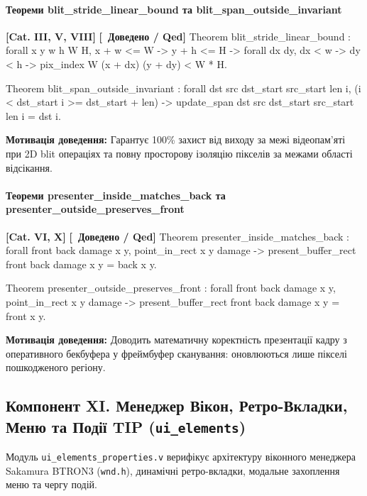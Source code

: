 \documentclass{article}
\let\originalfootnotesize\footnotesize
\let\oldverbatim\verbatim
\let\oldendverbatim\endverbatim
\renewenvironment{verbatim}{\originalfootnotesize\oldverbatim}{\oldendverbatim}
\newcommand{\thmcategory}[1]{{\small\textbf{\color{coreblue}[#1]}}}
\newcommand{\thmproven}{{\small\textbf{\color{productgreen}[\checkmark\ Доведено / Qed]}}}
\newcommand{\thmmotivation}[1]{%
  \par\smallskip\noindent\colorbox{boxbg}{\parbox{\dimexpr\linewidth-2\fboxsep\relax}{%
    \small\textbf{Мотивація доведення:} #1%
  }}\par\medskip
}
\begin{document}
\paragraph{Теореми blit\_stride\_linear\_bound та blit\_span\_outside\_invariant} \thmcategory{Cat. III, V, VIII} \thmproven
\begin{verbatim}
Theorem blit_stride_linear_bound : forall x y w h W H,
  x + w <= W -> y + h <= H ->
  forall dx dy, dx < w -> dy < h ->
  pix_index W (x + dx) (y + dy) < W * H.

Theorem blit_span_outside_invariant : forall dst src dst_start src_start len i,
  (i < dst_start \/ i >= dst_start + len) ->
  update_span dst src dst_start src_start len i = dst i.
\end{verbatim}
\thmmotivation{Гарантує 100\% захист від виходу за межі відеопам'яті при 2D blit операціях та повну просторову ізоляцію пікселів за межами області відсікання.}

\paragraph{Теореми presenter\_inside\_matches\_back та presenter\_outside\_preserves\_front} \thmcategory{Cat. VI, X} \thmproven
\begin{verbatim}
Theorem presenter_inside_matches_back : forall front back damage x y,
  point_in_rect x y damage ->
  present_buffer_rect front back damage x y = back x y.

Theorem presenter_outside_preserves_front : forall front back damage x y,
  ~ point_in_rect x y damage ->
  present_buffer_rect front back damage x y = front x y.
\end{verbatim}
\thmmotivation{Доводить математичну коректність презентації кадру з оперативного бекбуфера у фреймбуфер сканування: оновлюються лише пікселі пошкодженого регіону.}

\subsection[Компонент XI. Менеджер Вікон та HMI]{Компонент XI. Менеджер Вікон, Ретро-Вкладки, Меню та Події TIP (\texttt{ui\_elements})}

Модуль \texttt{ui\_elements\_properties.v} верифікує архітектуру віконного менеджера Sakamura BTRON3 (\texttt{wnd.h}), динамічні ретро-вкладки, модальне захоплення меню та чергу подій.
\end{document}
